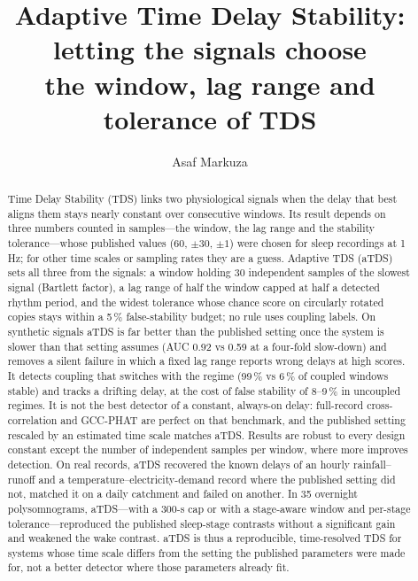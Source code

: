 \documentclass[11pt,a4paper]{article}
\title{Adaptive Time Delay Stability: letting the signals choose\\the window, lag range and tolerance of TDS}
\author{Asaf Markuza}
\date{}
\begin{document}
\maketitle

\begin{abstract}
Time Delay Stability (TDS) links two physiological signals when the delay that best aligns them stays nearly constant over consecutive windows. Its result depends on three numbers counted in samples---the window, the lag range and the stability tolerance---whose published values (60, $\pm30$, $\pm1$) were chosen for sleep recordings at 1\,Hz; for other time scales or sampling rates they are a guess. Adaptive TDS (aTDS) sets all three from the signals: a window holding 30 independent samples of the slowest signal (Bartlett factor), a lag range of half the window capped at half a detected rhythm period, and the widest tolerance whose chance score on circularly rotated copies stays within a 5\,\% false-stability budget; no rule uses coupling labels. On synthetic signals aTDS is far better than the published setting once the system is slower than that setting assumes (AUC 0.92 vs 0.59 at a four-fold slow-down) and removes a silent failure in which a fixed lag range reports wrong delays at high scores. It detects coupling that switches with the regime (99\,\% vs 6\,\% of coupled windows stable) and tracks a drifting delay, at the cost of false stability of 8--9\,\% in uncoupled regimes. It is not the best detector of a constant, always-on delay: full-record cross-correlation and GCC-PHAT are perfect on that benchmark, and the published setting rescaled by an estimated time scale matches aTDS. Results are robust to every design constant except the number of independent samples per window, where more improves detection. On real records, aTDS recovered the known delays of an hourly rainfall--runoff and a temperature--electricity-demand record where the published setting did not, matched it on a daily catchment and failed on another. In 35 overnight polysomnograms, aTDS---with a 300-s cap or with a stage-aware window and per-stage tolerance---reproduced the published sleep-stage contrasts without a significant gain and weakened the wake contrast. aTDS is thus a reproducible, time-resolved TDS for systems whose time scale differs from the setting the published parameters were made for, not a better detector where those parameters already fit.
\end{abstract}
\end{document}

